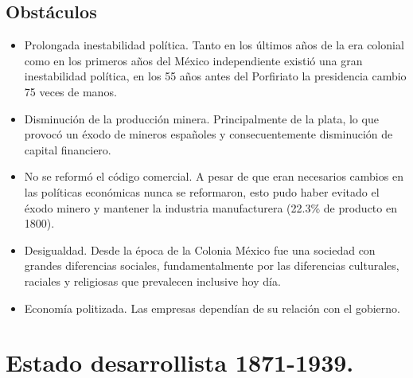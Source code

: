 \subsection{Obstáculos}
\begin{itemize}
    \item Prolongada inestabilidad política. Tanto en los últimos años de la era colonial como en los primeros años del México independiente existió una gran inestabilidad política, en los 55 años antes del Porfiriato la presidencia cambio 75 veces de manos.
    \item Disminución de la producción minera. Principalmente de la plata, lo que provocó un éxodo de mineros españoles y consecuentemente disminución de capital financiero.
    \item No se reformó el código comercial. A pesar de que eran necesarios cambios en las políticas económicas nunca se reformaron, esto pudo haber evitado el éxodo minero y mantener la industria manufacturera (22.3\% de producto en 1800).
    \item Desigualdad. Desde la época de la Colonia México fue una sociedad con grandes diferencias sociales, fundamentalmente por las diferencias culturales, raciales y religiosas que prevalecen inclusive hoy día.
    \item Economía politizada. Las empresas dependían de su relación con el gobierno.
\end{itemize}

\section{Estado desarrollista 1871-1939.}
